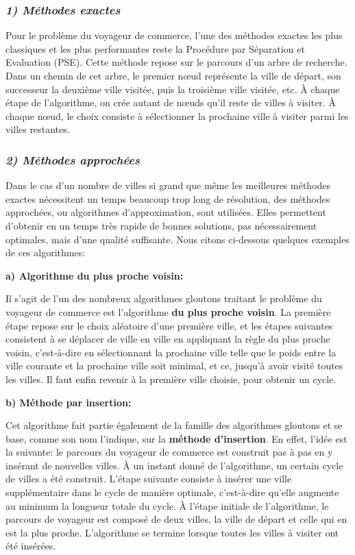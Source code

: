\documentclass[12pt, openany]{report}
\begin{document}
\setlength{\parindent}{1cm} \subsubsection{\textit{1)  \quad	Méthodes exactes}}
Pour le problème du voyageur de commerce, l’une des méthodes exactes les plus classiques et les plus performantes reste la Procédure par Séparation et Evaluation (PSE). Cette méthode repose sur le parcours d’un arbre de recherche. Dans un chemin de cet arbre, le premier nœud représente la ville de départ, son successeur la deuxième ville visitée, puis la troisième ville visitée, etc. À chaque étape de l’algorithme, on crée autant de nœuds qu’il reste de villes à visiter. À chaque nœud, le choix consiste à sélectionner la prochaine ville à visiter parmi les villes restantes.
\setlength{\parindent}{1cm} \subsubsection{\textit{2)  \quad	Méthodes approchées}}
Dans le cas d’un nombre de villes si grand que même les meilleures méthodes exactes nécessitent un temps beaucoup trop long de résolution, des méthodes approchées, ou algorithmes d’approximation, sont utilisées. Elles permettent d’obtenir en un temps très rapide de bonnes solutions, pas nécessairement optimales, mais d’une qualité suffisante.
Nous citons ci-dessous quelques exemples de ces algorithmes:

\quad \textbf{a) Algorithme du plus proche voisin:} 

Il s'agit de l'un des nombreux algorithmes gloutons traitant le problème du voyageur de commerce est l'algorithme \textbf{du plus proche voisin}. La première étape repose sur le choix aléatoire d’une première ville, et les étapes suivantes consistent à se déplacer de ville en ville en appliquant la règle du plus proche voisin, c’est-à-dire en sélectionnant la prochaine ville telle que le poids entre la ville courante et la prochaine ville soit minimal, et ce, jusqu’à avoir visité toutes les villes. Il faut enfin revenir à la première ville choisie, pour obtenir un cycle.

\quad \textbf{b) Méthode par insertion:} 

Cet algorithme fait partie également de la famille des algorithmes gloutons et se base, comme son nom l'indique, sur la \textbf{méthode d'insertion}. En effet, l'idée est la suivante: le parcours du voyageur de commerce est construit pas à pas en y insérant de nouvelles villes. À un instant donné de l’algorithme, un certain cycle de villes a été construit. L’étape suivante consiste à insérer une ville supplémentaire dans le cycle de manière optimale, c’est-à-dire qu’elle augmente au minimum la longueur totale du cycle. À l’étape initiale de l’algorithme, le parcours de voyageur est composé de deux villes, la ville de départ et celle qui en est la plus proche. L’algorithme se termine lorsque toutes les villes à visiter ont été insérées. 
\end{document}
